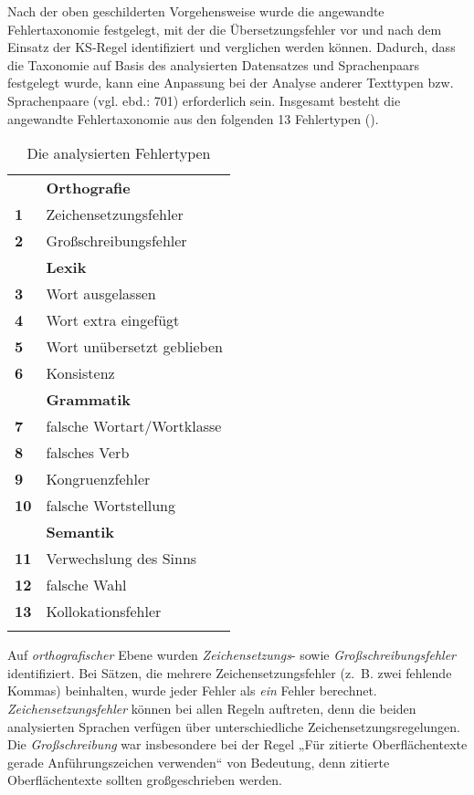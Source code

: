 Nach der oben geschilderten Vorgehensweise wurde die angewandte Fehlertaxonomie festgelegt, mit der die Übersetzungsfehler vor und nach dem Einsatz der KS-Regel identifiziert und verglichen werden können. Dadurch, dass die Taxonomie auf Basis des analysierten Datensatzes und Sprachenpaars festgelegt wurde, kann eine Anpassung bei der Analyse anderer Texttypen bzw. Sprachenpaare (vgl. ebd.: 701) erforderlich sein. Insgesamt besteht die angewandte Fehlertaxonomie aus den folgenden 13 Fehlertypen ().



\begin{table}
\begin{tabularx}{.5\textwidth}{lX}
\lsptoprule
& \textbf{Orthografie}\\
\textbf{1} &  Zeichensetzungsfehler\\
\textbf{2} &  Großschreibungsfehler\\
\tablevspace
& \textbf{Lexik}\\
\textbf{3} &  Wort ausgelassen\\
\textbf{4} &  Wort extra eingefügt\\
\textbf{5} &  Wort unübersetzt geblieben\\
\textbf{6} &  Konsistenz\\
\tablevspace
& \textbf{Grammatik}\\
\textbf{7} &  falsche Wortart/Wortklasse\\
\textbf{8} &  falsches Verb\\
\textbf{9} &  Kongruenzfehler\\
\textbf{10} &  falsche Wortstellung\\
\tablevspace
& \textbf{Semantik}\\
\textbf{11} &  Verwechslung des Sinns\\
\textbf{12} &  falsche Wahl\\
\textbf{13} &  Kollokationsfehler\\
\lspbottomrule
\end{tabularx}
\caption{\label{tab:4:9}Die analysierten Fehlertypen}
\end{table}

Auf \textit{orthografischer} Ebene wurden \textit{Zeichensetzungs}{}- sowie \textit{Großschreibungsfehler} identifiziert. Bei Sätzen, die mehrere Zeichensetzungsfehler (z.~B. zwei fehlende Kommas) beinhalten, wurde jeder Fehler als \textit{ein} Fehler berechnet. \textit{Zeichensetzungsfehler} können bei allen Regeln auftreten, denn die beiden analysierten Sprachen verfügen über unterschiedliche Zeichensetzungsregelungen. Die \textit{Großschreibung} war insbesondere bei der Regel „Für zitierte Oberflächentexte gerade Anführungszeichen verwenden“ von Bedeutung, denn zitierte Oberflächentexte sollten großgeschrieben werden.

